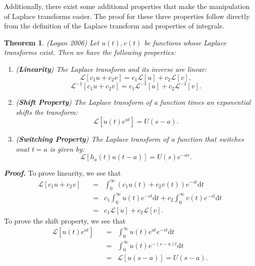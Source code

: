 \documentclass[12pt]{article}
\theoremstyle{plain}
\newtheorem{theorem}{Theorem}[section]
\theoremstyle{definition}
\begin{document}
Additionally, there exist some additional properties that make the manipulation of Laplace transforms easier. The proof for these three properties follow directly from the definition of the Laplace transform and properties of integrals.
\begin{theorem}
    (Logan 2006) Let $u(t),v(t)$ be functions whose Laplace transforms exist. Then we have the following properties:
    \begin{enumerate}
        \item (\textbf{Linearity}) The Laplace transform and its inverse are linear:
        \begin{equation*}
            \mathcal{L}[c_1u + c_2v] = c_1\mathcal{L}[u] + c_2\mathcal{L}[v],
        \end{equation*}
        \begin{equation*}
            \mathcal{L}^{-1}[c_1u + c_2v] = c_1\mathcal{L}^{-1}[u] + c_2\mathcal{L}^{-1}[v].
        \end{equation*}
        \item (\textbf{Shift Property}) The Laplace transform of a function times an exponential shifts the transform:
        \begin{equation*}
            \mathcal{L}[u(t)e^{at}] = U(s-a).
        \end{equation*}
        \item (\textbf{Switching Property}) The Laplace transform of a function that switches on\footnotemark at $t=a$ is given by:
        \begin{equation*}
            \mathcal{L}[h_a(t)u(t-a)] = U(s)e^{-as}.
        \end{equation*}
    \end{enumerate}
\end{theorem}
\emph{\textbf{Proof.}} To prove linearity, we see that
\begin{align*}
    \mathcal{L}[c_1u + c_2v] \quad & = & \int_{0}^{\infty}(c_1u(t)+c_2v(t))e^{-st}\mathrm{d}t \\
    & = & c_1\int_{0}^{\infty}u(t)e^{-st}\mathrm{d}t + c_2\int_{0}^{\infty}v(t)e^{-st}\mathrm{d}t \\
    & = & c_1\mathcal{L}[u] + c_2\mathcal{L}[v].
\end{align*}
To prove the shift property, we see that
\begin{align*}
    \mathcal{L}[u(t)e^{at}] \quad & = & \int_{0}^{\infty}u(t)e^{at}e^{-st} \mathrm{d}t \\
    & = & \int_{0}^{\infty}u(t)e^{-(s-a)t}\mathrm{d}t \\
    & = & \mathcal{L}[u(s-a)] = U(s-a).
\end{align*}
\end{document}
